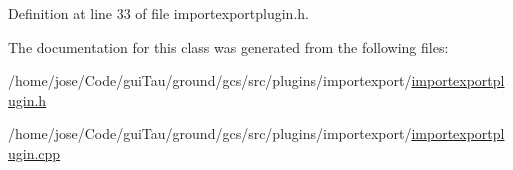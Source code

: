 Definition at line 33 of file importexportplugin.\-h.



The documentation for this class was generated from the following files\-:\begin{DoxyCompactItemize}
\item 
/home/jose/\-Code/gui\-Tau/ground/gcs/src/plugins/importexport/\hyperlink{importexportplugin_8h}{importexportplugin.\-h}\item 
/home/jose/\-Code/gui\-Tau/ground/gcs/src/plugins/importexport/\hyperlink{importexportplugin_8cpp}{importexportplugin.\-cpp}\end{DoxyCompactItemize}
